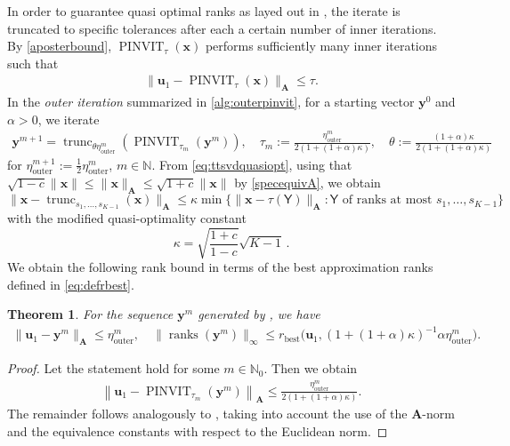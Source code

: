 \documentclass[a4paper,11pt,oneside]{amsart}
\DeclareMathOperator{\ranks}{ranks}
\providecommand{\norm}[1]{\lVert#1\rVert}
\newtheorem{theorem}{Theorem}
\theoremstyle{definition}
\theoremstyle{remark}
\newcommand{\A}{\ten A}
\newcommand{\N}{\mathbb{N}}
\newcommand{\ten}[1]{\boldsymbol{#1}}
\newcommand{\rep}[1]{\mathsf{#1}}
\newcommand{\rmap}[1]{\tau(#1)}
\newcommand{\PINVIT}{\ensuremath{\operatorname{PINVIT}}}
\newcommand{\etaout}{\eta_{\mathrm{outer}}}
\numberwithin{equation}{section}
\numberwithin{theorem}{section}
\begin{document}
In order to guarantee quasi optimal ranks as layed out in \cite{B23}, the iterate is truncated to specific tolerances after each a certain number of inner iterations.  By \cref{aposterbound}, $\PINVIT_\tau(\ten x)$ performs sufficiently many inner iterations such that
\begin{align*}
 \| \ten u_1 - \PINVIT_\tau(\ten x) \|_{\A} \leq \tau.
\end{align*}
In the {\em outer iteration} summarized in \cref{alg:outerpinvit}, for a starting vector $\ten{y}^0$ and $\alpha > 0$, we iterate %
\begin{align*}
 \ten{y}^{m+1} = \operatorname{trunc}_{\theta \etaout^m}\left( \PINVIT_{\tau_m}(\ten{y}^m) \right), \quad \tau_m := \frac{\etaout^m}{2 (1+(1+\alpha)\kappa)}    , \quad \theta := \frac{(1+\alpha) \kappa}{2(1+(1+\alpha)\kappa)}
\end{align*}
for $\etaout^{m+1} := \frac{1}{2} \etaout^m$, $m \in \N$. 
From \cref{eq:ttsvdquasiopt}, using that $\sqrt{1-c} \norm{\ten x} \leq \norm{\ten x}_{\ten A} \leq \sqrt{1+c} \norm{\ten x} $ by \eqref{specequivA}, we obtain
\begin{equation*}
   \norm{ \ten x -  \operatorname{trunc}_{s_1,\ldots,s_{K-1}}(\ten x) }_{\ten A} \leq \kappa  \min\bigl\{ \norm{\ten x - \rmap{\rep Y}}_{\ten A} \colon \rep Y \text{ of ranks at most $s_1,\ldots, s_{K-1}$} \bigr\}
\end{equation*}
with the modified quasi-optimality constant
\begin{equation}\label{kappadef}
 \kappa = \sqrt{\frac{1 + c}{1-c}} \sqrt{K-1} \,.
\end{equation}
We obtain the following rank bound in terms of the best approximation ranks defined in \eqref{eq:defrbest}.


\begin{theorem}\label{thm:quasioptr}
 For the sequence $\ten y^m$ generated by , we have
 \begin{align*}
  \|\ten{u}_1 - \ten y^m\|_{\A} \leq \etaout^m, \quad \norm{\ranks(\ten y^m)}_\infty \leq r_{\mathrm{best}}\bigl(\ten{u}_1, (1+(1+\alpha)\kappa)^{-1} \alpha \etaout^m \bigr).
 \end{align*}
\end{theorem}
\begin{proof}
 Let the statement hold for some $m \in \N_0$. Then we obtain
 \begin{align}\label{priortrunccond}
 \left\| \ten{u}_1 - \PINVIT_{\tau_m}(\ten y^m) \right\|_{\A} \leq \frac{\etaout^m}{2 (1+(1+\alpha)\kappa)}.
\end{align}
The remainder follows analogously to \cite[Theorem 5.5]{B23}, taking into account the use of the $\ten A$-norm and the equivalence constants with respect to the Euclidean norm.
\end{proof}
\end{document}
